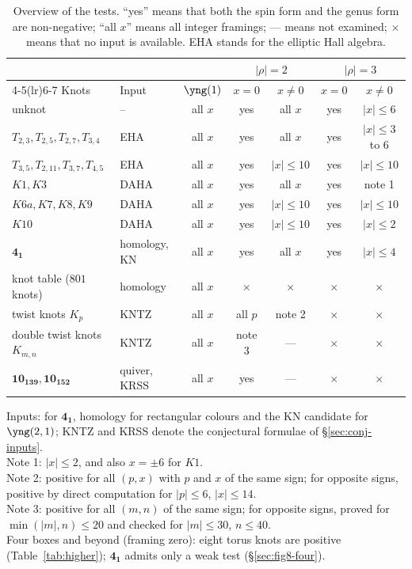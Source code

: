 \begin{table}[t]
\centering
\caption{Overview of the tests. ``yes'' means that both the spin form and the genus form are non-negative; ``all $x$'' means all integer framings; --- means not examined; $\times$ means that no input is available.
EHA stands for the elliptic Hall algebra.}\label{tab:overview}
\small
\begin{tabular}{llccccc}
\toprule
 & & & \multicolumn{2}{c}{$|\rho|=2$} & \multicolumn{2}{c}{$|\rho|=3$} \\
\cmidrule(lr){4-5}\cmidrule(lr){6-7}
Knots & Input & $\yng(1)$ & $x=0$ & $x\neq0$ & $x=0$ & $x\neq0$ \\
\midrule
unknot & -- & all $x$ & yes & all $x$ & yes & $|x|\le6$ \\
$T_{2,3},T_{2,5},T_{2,7},T_{3,4}$ & EHA & all $x$ & yes & all $x$ & yes & $|x|\le 3$ to $6$ \\
$T_{3,5},T_{2,11},T_{3,7},T_{4,5}$ & EHA & all $x$ & yes & $|x|\le10$ & yes & $|x|\le10$ \\
$K1,K3$ & DAHA & all $x$ & yes & all $x$ & yes & note 1 \\
$K6a,K7,K8,K9$ & DAHA & all $x$ & yes & $|x|\le10$ & yes & $|x|\le10$ \\
$K10$ & DAHA & all $x$ & yes & $|x|\le10$ & yes & $|x|\le2$ \\
$\mathbf{4_1}$ & homology, KN & all $x$ & yes & all $x$ & yes & $|x|\le4$ \\
knot table ($801$ knots) & homology & all $x$ & $\times$ & $\times$ & $\times$ & $\times$ \\
twist knots $K_p$ & KNTZ & all $x$ & all $p$ & note 2 & $\times$ & $\times$ \\
double twist knots $K_{m,n}$ & KNTZ & all $x$ & note 3 & --- & $\times$ & $\times$ \\
$\mathbf{10_{139}},\mathbf{10_{152}}$ & quiver, KRSS & all $x$ & yes & --- & $\times$ & $\times$ \\
\bottomrule
\end{tabular}

\smallskip
\raggedright\small
Inputs: for $\mathbf{4_1}$, homology for rectangular colours and the KN candidate for $\yng(2,1)$; KNTZ and KRSS denote the conjectural formulae of \S\ref{sec:conj-inputs}.\\
Note 1: $|x|\le2$, and also $x=\pm6$ for $K1$.\\
Note 2: positive for all $(p,x)$ with $p$ and $x$ of the same sign; for opposite signs, positive by direct computation for $|p|\le6$, $|x|\le14$.\\
Note 3: positive for all $(m,n)$ of the same sign; for opposite signs, proved for $\min(|m|,n)\le20$ and checked for $|m|\le30$, $n\le40$.\\
Four boxes and beyond (framing zero): eight torus knots are positive (Table~\ref{tab:higher}); $\mathbf{4_1}$ admits only a weak test (\S\ref{sec:fig8-four}).
\end{table}

